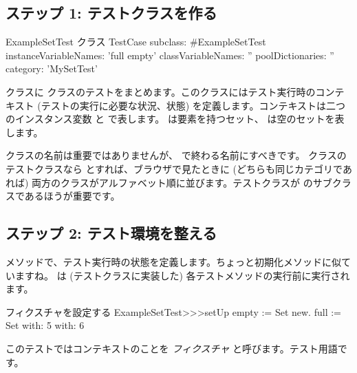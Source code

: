 \documentclass[a4paper,10pt,twoside]{book}
\begin{document}
\subsection{ステップ 1: テストクラスを作る}


\begin{classdef}[exampleSetTest]{ExampleSetTest クラス}
TestCase subclass: #ExampleSetTest
	instanceVariableNames: 'full empty'
	classVariableNames: ''
	poolDictionaries: ''
	category: 'MySetTest'
\end{classdef}

 クラスに  クラスのテストをまとめます。このクラスにはテスト実行時のコンテキスト (テストの実行に必要な状況、状態) を定義します。コンテキストは二つのインスタンス変数  と  で表します。  は要素を持つセット、  は空のセットを表します。

クラスの名前は重要ではありませんが、  で終わる名前にすべきです。  クラスのテストクラスなら  とすれば、ブラウザで見たときに (どちらも同じカテゴリであれば) 両方のクラスがアルファベット順に並びます。テストクラスが  のサブクラスであるほうが重要です。

\subsection{ステップ 2: テスト環境を整える}

 メソッドで、テスト実行時の状態を定義します。ちょっと初期化メソッドに似ていますね。  は (テストクラスに実装した) 各テストメソッドの実行前に実行されます。



\begin{method}[setupExampleSetTest]{フィクスチャを設定する}
ExampleSetTest>>>setUp
	empty := Set new.
	full := Set with: 5 with: 6
\end{method}

\noindent

このテストではコンテキストのことを \emph{フィクスチャ} と呼びます。テスト用語です。
\end{document}
